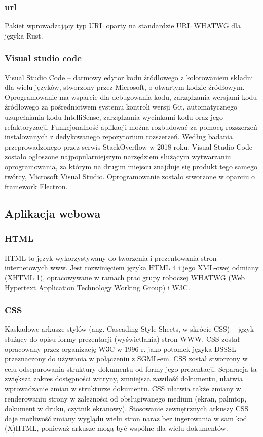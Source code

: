 \documentclass[12pt,a4paper]{article}
\begin{document}
				\subsubsection{url}

					\indent Pakiet wprowadzający typ URL oparty na standardzie URL WHATWG dla języka Rust.
				\subsubsection{Visual studio code}

					\indent Visual Studio Code – darmowy edytor kodu źródłowego z kolorowaniem składni dla wielu języków, stworzony przez Microsoft,
					o otwartym kodzie źródłowym. Oprogramowanie ma wsparcie dla debugowania kodu, zarządzania wersjami kodu źródłowego za pośrednictwem systemu kontroli wersji Git,
					automatycznego uzupełniania kodu IntelliSense, zarządzania wycinkami kodu oraz jego refaktoryzacji. Funkcjonalność aplikacji można rozbudować za pomocą rozszerzeń
					instalowanych z dedykowanego repozytorium rozszerzeń. Według badania przeprowadzonego przez serwis StackOverflow w 2018 roku, Visual Studio Code zostało
					ogłoszone najpopularniejszym narzędziem służącym wytwarzaniu oprogramowania, za którym na drugim miejscu znajduje się produkt tego samego twórcy,
					Microsoft Visual Studio. Oprogramowanie zostało stworzone w oparciu o framework Electron. 
				
\subsection{Aplikacja webowa}

		\subsubsection{HTML}
		\indent HTML to język wykorzystywany do tworzenia i prezentowania stron internetowych www. Jest rozwinięciem języka HTML 4 i jego XML-owej odmiany (XHTML 1), opracowywane w ramach prac grupy roboczej WHATWG (Web Hypertext Application Technology Working Group) i W3C.
		\subsubsection{CSS}
		Kaskadowe arkusze stylów (ang. Cascading Style Sheets, w skrócie CSS) – język służący do opisu formy prezentacji (wyświetlania) stron WWW. CSS został opracowany przez organizację W3C w 1996 r. jako potomek języka DSSSL przeznaczony do używania w połączeniu z SGML-em.
		CSS został stworzony w celu odseparowania struktury dokumentu od formy jego prezentacji. Separacja ta zwiększa zakres dostępności witryny, zmniejsza zawiłość dokumentu, ułatwia wprowadzanie zmian w strukturze dokumentu. CSS ułatwia także zmiany w renderowaniu strony w zależności od obsługiwanego medium (ekran, palmtop, dokument w druku, czytnik ekranowy). Stosowanie zewnętrznych arkuszy CSS daje możliwość zmiany wyglądu wielu stron naraz bez ingerowania w sam kod (X)HTML, ponieważ arkusze mogą być wspólne dla wielu dokumentów.
\end{document}
